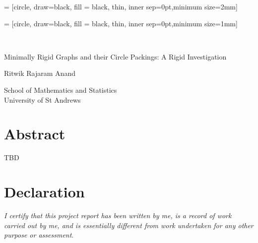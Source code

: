  = [circle, draw=black, fill = black, thin, inner sep=0pt,minimum size=2mm]

 = [circle, draw=black, fill = black, thin, inner sep=0pt,minimum size=1mm]


\thispagestyle{empty}

{%

\centering
\Large

~\vspace{\fill}

{\huge 
Minimally Rigid Graphs and their Circle Packings: A Rigid Investigation
}

\vspace{2.5cm}

{\LARGE
Ritwik Rajaram Anand
}

\vspace{3.5cm}


School of Mathematics and Statistics\\
University of St Andrews

\vspace{3.5cm}

\vspace{\fill}

\date{April 2024}

}%

\cleardoublepage

\section*{Abstract}    
TBD

\section*{Declaration}
\textit{I certify that this project report has been written by me, is a record of work
carried out by me, and is essentially different from work undertaken for any
other purpose or assessment}.

\clearpage


\tableofcontents*

\clearpage
